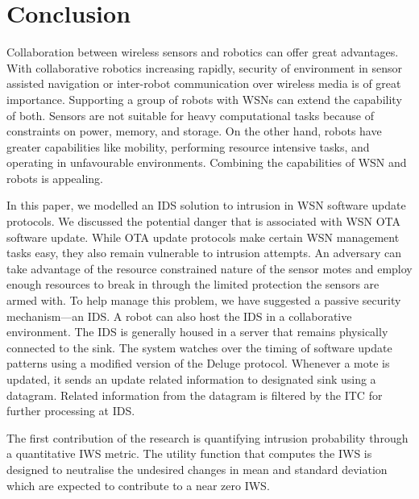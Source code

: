 \documentclass[conference,manuscript]{IEEEtran}
\begin{document}
\section{Conclusion}
\label{sec:concl}

Collaboration between wireless sensors and robotics can offer great advantages. 
With collaborative robotics increasing rapidly, security of environment in sensor assisted navigation or inter-robot communication over wireless media is of great importance.
Supporting a group of robots with WSNs  can extend the capability of both. 
Sensors are not suitable for heavy computational tasks because of constraints on power, memory, and storage. 
On the other hand, robots have greater capabilities like mobility, performing resource intensive tasks, and operating in unfavourable
environments.
Combining the capabilities of WSN and robots is appealing. 


In this paper, we modelled an IDS solution to intrusion in WSN software update protocols.
We discussed the potential danger that is associated with WSN OTA software update.
While OTA update protocols make certain WSN management tasks easy, they also remain vulnerable to intrusion attempts.
An adversary can take advantage of the resource constrained nature of the sensor motes and employ enough resources to break in through the limited protection the sensors are armed with.
To help manage this problem, we have suggested a passive security mechanism---an IDS.
A robot can also host the IDS in a collaborative environment.
The IDS is generally housed in a server that remains physically connected to the  sink. 
The system watches over the timing of software update patterns using a modified version of the Deluge protocol.
Whenever a mote is updated, it sends an update related information to designated sink using a datagram.  
Related information from the datagram is filtered by the ITC for further processing at IDS.

The first contribution of the research is quantifying intrusion probability through a quantitative IWS metric. 
The utility function that computes the IWS is designed to neutralise the undesired %
changes in mean and standard deviation which are expected to contribute to a near zero IWS.%
\end{document}

